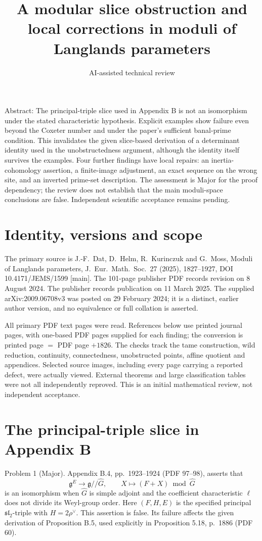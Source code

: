 \documentclass[10pt]{article}
\title{A modular slice obstruction and local corrections
in moduli of Langlands parameters}
\author{AI-assisted technical review}
\date{}
\begin{document}
\maketitle
Abstract: The principal-triple slice used in Appendix B is not an isomorphism under the stated characteristic hypothesis. Explicit examples show failure even beyond the Coxeter number and under the paper’s sufficient banal-prime condition. This invalidates the given slice-based derivation of a determinant identity used in the unobstructedness argument, although the identity itself survives the examples. Four further findings have local repairs: an inertia-cohomology assertion, a finite-image adjustment, an exact sequence on the wrong site, and an inverted prime-set description. The assessment is Major for the proof dependency; the review does not establish that the main moduli-space conclusions are false. Independent scientific acceptance remains pending.\par
\section*{Identity, versions and scope}
The primary source is J.-F. Dat, D. Helm, R. Kurinczuk and G. Moss, Moduli of Langlands parameters, J. Eur. Math. Soc. 27 (2025), 1827–1927, DOI 10.4171/JEMS/1599 [main]. The 101-page publisher PDF records revision on 8 August 2024. The publisher records publication on 11 March 2025. The supplied arXiv:2009.06708v3 was posted on 29 February 2024; it is a distinct, earlier author version, and no equivalence or full collation is asserted.\par
All primary PDF text pages were read. References below use printed journal pages, with one-based PDF pages supplied for each finding; the conversion is printed page \(=\) PDF page \(+1826\). The checks track the tame construction, wild reduction, continuity, connectedness, unobstructed points, affine quotient and appendices. Selected source images, including every page carrying a reported defect, were actually viewed. External theorems and large classification tables were not all independently reproved. This is an initial mathematical review, not independent acceptance.\par
\section*{The principal-triple slice in Appendix B}
Problem 1 (Major).  Appendix B.4, pp. 1923–1924 (PDF 97–98), asserts that \[\mathfrak g^E\longrightarrow\mathfrak g/\!/\widehat G,\qquad
 X\longmapsto(F+X)\bmod\widehat G\tag{1}\] is an isomorphism when \(\widehat G\) is simple adjoint and the coefficient characteristic \(\ell\) does not divide its Weyl-group order. Here \((F,H,E)\) is the specified principal \(\mathfrak{sl}_2\)-triple with \(H=2\rho^\vee\). This assertion is false. Its failure affects the given derivation of Proposition B.5, used explicitly in Proposition 5.18, p. 1886 (PDF 60).\par
\end{document}
